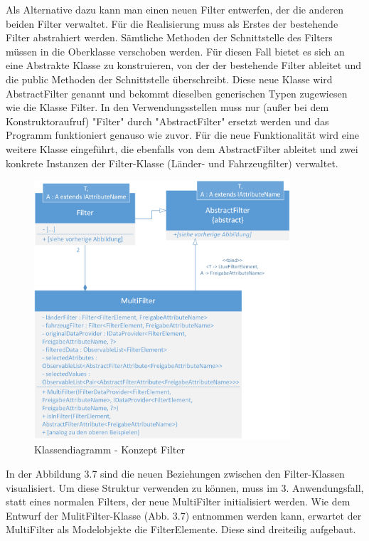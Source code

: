 Als Alternative dazu kann man einen neuen Filter entwerfen, der die anderen beiden Filter verwaltet. Für die Realisierung muss als Erstes der bestehende Filter abstrahiert werden. Sämtliche Methoden der Schnittstelle des Filters müssen in die Oberklasse verschoben werden. Für diesen Fall bietet es sich an eine Abstrakte Klasse zu konstruieren, von der der bestehende Filter ableitet und die public Methoden der Schnittstelle überschreibt. Diese neue Klasse wird AbstractFilter genannt und bekommt dieselben generischen Typen zugewiesen wie die Klasse Filter. In den Verwendungsstellen muss nur (außer bei dem Konstruktoraufruf) "Filter" durch "AbstractFilter" ersetzt werden und das Programm funktioniert genauso wie zuvor. Für die neue Funktionalität wird eine weitere Klasse eingeführt, die ebenfalls von dem AbstractFilter ableitet und zwei konkrete Instanzen der Filter-Klasse (Länder- und Fahrzeugfilter) verwaltet.

\begin{figure}[H]
 \centering
 \includegraphics[width=0.85\textwidth]{grafiken/Class_MultiFilter.png}
 \caption{Klassendiagramm - Konzept Filter}
 \label{fig:multiFilter2}
\end{figure}

In der Abbildung 3.7 sind die neuen Beziehungen zwischen den Filter-Klassen visualisiert. Um diese Struktur verwenden zu können, muss im 3. Anwendungsfall, statt eines normalen Filters, der neue MultiFilter initialisiert werden. Wie dem Entwurf der MulitFilter-Klasse (Abb. 3.7) entnommen werden kann, erwartet der MultiFilter als Modelobjekte die FilterElemente. Diese sind dreiteilig aufgebaut.

